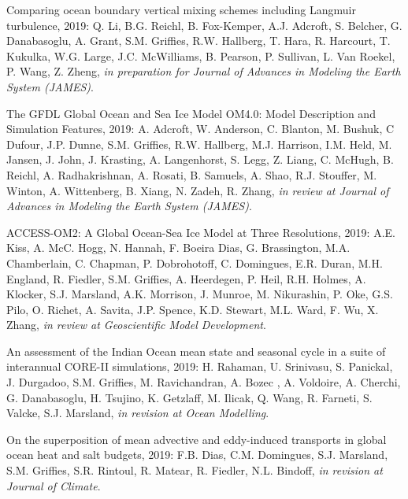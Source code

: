 \begin{etaremune}
\item Comparing ocean boundary vertical mixing schemes including Langmuir turbulence, 2019: Q. Li, B.G. Reichl,  B. Fox-Kemper, A.J. Adcroft, S. Belcher, G. Danabasoglu, A. Grant, S.M. Grif\/f\/ies, R.W. Hallberg, T. Hara, R. Harcourt, T. Kukulka, W.G. Large, J.C. McWilliams, B. Pearson, P. Sullivan, L. Van Roekel, P. Wang, Z. Zheng, {\it in preparation for Journal of Advances in Modeling the Earth System (JAMES)}.

\item The GFDL Global Ocean and Sea Ice Model OM4.0: Model Description and Simulation Features, 2019: A. Adcroft, W. Anderson, C. Blanton, M. Bushuk, C Dufour, J.P. Dunne, S.M. Grif\/f\/ies, R.W. Hallberg, M.J. Harrison, I.M. Held, M.  Jansen, J. John, J. Krasting, A. Langenhorst, S. Legg, Z. Liang, C. McHugh, B. Reichl, A. Radhakrishnan, A. Rosati, B. Samuels, A. Shao, R.J. Stouffer, M. Winton, A. Wittenberg, B. Xiang, N. Zadeh, R. Zhang, {\it in review at Journal of Advances in Modeling the Earth System (JAMES)}.

\item ACCESS-OM2: A Global Ocean-Sea Ice Model at Three Resolutions, 2019: A.E. Kiss, A. McC. Hogg, N. Hannah, F. Boeira Dias, G. Brassington, M.A. Chamberlain, C. Chapman, P. Dobrohotoff, C. Domingues, E.R. Duran, M.H. England, R. Fiedler, S.M. Grif\/f\/ies,  A. Heerdegen, P. Heil, R.H. Holmes, A. Klocker, S.J. Marsland, A.K. Morrison, J. Munroe, M. Nikurashin, P. Oke, G.S. Pilo,
O. Richet, A. Savita, J.P. Spence, K.D. Stewart, M.L. Ward, F. Wu, X. Zhang, {\it in review at Geoscientific Model Development}.  

\item An assessment of the Indian Ocean mean state and seasonal cycle in a suite of interannual CORE-II simulations, 2019: H. Rahaman, U. Srinivasu,  S. Panickal, J. Durgadoo, S.M. Grif\/f\/ies, M. Ravichandran, A. Bozec , A. Voldoire, A. Cherchi, G. Danabasoglu, H. Tsujino, K. Getzlaff, M. Ilicak, Q. Wang, R. Farneti, S. Valcke, S.J. Marsland, {\it in revision at Ocean Modelling}.

\item On the superposition of mean advective and eddy-induced transports in global ocean heat and salt budgets, 2019: F.B. Dias, C.M. Domingues, S.J. Marsland, S.M. Grif\/f\/ies, S.R. Rintoul, R. Matear, R. Fiedler, N.L. Bindoff, {\it in revision at Journal of Climate}.


\end{etaremune}


